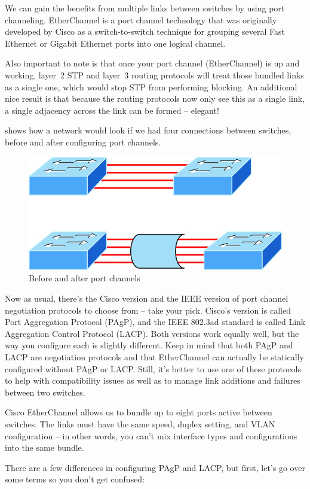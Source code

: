 We can gain the benefits from multiple links between switches by using
port channeling. EtherChannel is a port channel technology that was
originally developed by Cisco as a switch-to-switch technique for
grouping several Fast Ethernet or Gigabit Ethernet ports into one
logical channel.

Also important to note is that once your port channel (EtherChannel) is
up and working, layer~2 STP and layer~3 routing protocols will treat
those bundled links as a single one, which would stop STP from
performing blocking. An additional nice result is that because the
routing protocols now only see this as a single link, a single adjacency
across the link can be formed -- elegant!

 shows how a network would look if we had four connections between switches, before and after configuring port channels.

\begin{figure}
   \centering
   \includegraphics[width=.5\textwidth]{images/c15f020.jpg}
   \caption{Before and after port channels}
   \label{fig:etherchannel-before-after}
\end{figure}

Now as usual, there's
the Cisco version and the IEEE version of port channel negotiation
protocols to choose from -- take your pick. Cisco's version is called
Port Aggregation Protocol (PAgP), and the IEEE 802.3ad standard is
called Link Aggregation Control Protocol (LACP). Both versions work
equally well, but the way you configure each is slightly different. Keep
in mind that both PAgP and LACP are negotiation protocols and that
EtherChannel can actually be statically configured without PAgP or LACP.
Still, it's better to use one of these protocols to help with
compatibility issues as well as to manage link additions and failures
between two switches.

Cisco EtherChannel allows us to bundle up to eight ports active between
switches. The links must have the same speed, duplex setting, and VLAN
configuration -- in other words, you can't mix interface types and
configurations into the same bundle.

There are a few differences in configuring PAgP and LACP, but first,
let's go over some terms so you don't get confused:

